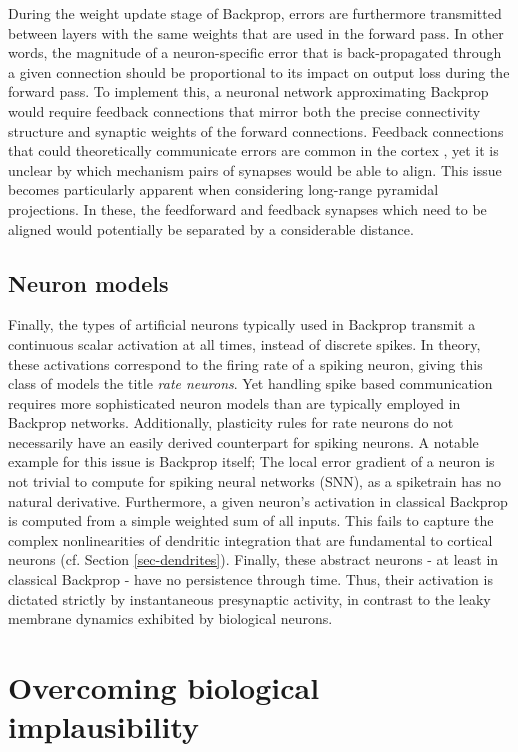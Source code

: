 During the weight update stage of Backprop, errors are furthermore transmitted between layers with the same weights that
are used in the forward pass. In other words, the magnitude of a neuron-specific error that is back-propagated through a
given connection should be proportional to its impact on output loss during the forward pass. To implement this, a
neuronal network approximating Backprop would require feedback connections that mirror both the precise connectivity
structure and synaptic weights of the forward connections. Feedback connections that could theoretically communicate
errors are common in the cortex \citep{Gilbert2013}, yet it is unclear by which mechanism pairs of synapses would be
able to align. This issue becomes particularly apparent when considering long-range pyramidal projections. In these, the
feedforward and feedback synapses which need to be aligned would potentially be separated by a considerable distance.

\subsection{Neuron models}

Finally, the types of artificial neurons typically used in Backprop transmit a continuous scalar activation at all
times, instead of discrete spikes. In theory, these activations correspond to the firing rate of a spiking neuron,
giving this class of models the title \textit{rate neurons}. Yet handling spike based communication requires more
sophisticated neuron models than are typically employed in Backprop networks. Additionally, plasticity rules for rate
neurons do not necessarily have an easily derived counterpart for spiking neurons. A notable example for this issue is
Backprop itself; The local error gradient of a neuron is not trivial to compute for spiking neural networks (SNN), as a
spiketrain has no natural derivative. Furthermore, a given neuron's activation in classical Backprop is computed from a
simple weighted sum of all inputs. This fails to capture the complex nonlinearities of dendritic integration that are
fundamental to cortical neurons (cf. Section \ref{sec-dendrites}). Finally, these abstract neurons - at least in
classical Backprop - have no persistence through time. Thus, their activation is dictated strictly by instantaneous
presynaptic activity, in contrast to the leaky membrane dynamics exhibited by biological neurons.

\section{Overcoming biological implausibility}

